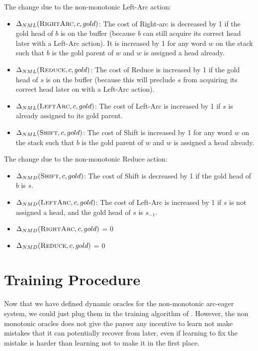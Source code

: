 \documentclass[11pt,letterpaper]{article}
\begin{document}
The change due to the non-monotonic Left-Arc action:

\begin{itemize}
   \item $\Delta_{NML}(\textsc{RightArc},c,gold)$: The cost of Right-arc is decreased by 1 if the gold head of $b$ is on the buffer
(because $b$ can still acquire its correct head later with a Left-Arc action).
It is increased by 1 for any word $w$ on the stack such that $b$ is the gold
parent of $w$ and $w$ is assigned a head already.

   \item $\Delta_{NML}(\textsc{Reduce},c,gold)$: The cost of Reduce is increased by 1 if the gold head of $s$ is on the buffer
(because this will preclude $s$ from acquiring its correct head later on with
a Left-Arc action).

   \item $\Delta_{NML}(\textsc{LeftArc},c,gold)$: The cost of Left-Arc is increased by 1 if $s$ is already assigned to its gold
parent.

  \item $\Delta_{NML}(\textsc{Shift},c,gold)$: The cost of Shift is increased by 1 for any word $w$ on the stack such that $b$ is the gold
parent of $w$ and $w$ is assigned a head already.
\end{itemize}

The change due to the non-monotonic Reduce action:
\begin{itemize}

   \item $\Delta_{NMD}(\textsc{Shift},c,gold)$: The cost of Shift is decreased by 1 if the gold head of $b$ is $s$.

   \item $\Delta_{NMD}(\textsc{LeftArc},c,gold)$: The cost of Left-Arc is increased by 1 if $s$ is not assigned a head, and the gold head of $s$ is $s_{-1}$.

   \item $\Delta_{NMD}(\textsc{RightArc},c,gold)$ = 0

   \item $\Delta_{NMD}(\textsc{Reduce},c,gold)$ = 0

\end{itemize}

\section{Training Procedure}

Now that we have defined dynamic oracles for the non-monotonic arc-eager
system, we could just plug them in the training algorithm of
\cite{coling2012}.  However, the non monotonic oracles does not give the
parser any incentive to learn not make mistakes that it can potentially recover from
later, even if learning to fix the mistake is harder than learning not to make
it in the first place.
\end{document}
